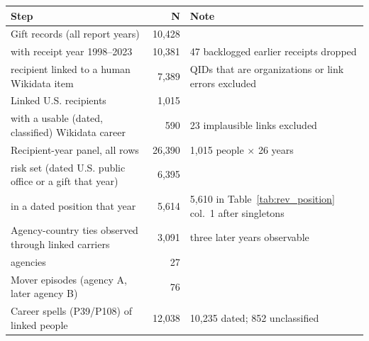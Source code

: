 \begin{tabular}{lrl}
\toprule
Step & N & Note \\
\midrule
Gift records (all report years) & 10,428 &  \\
\quad with receipt year 1998--2023 & 10,381 & 47 backlogged earlier receipts dropped \\
\quad recipient linked to a human Wikidata item & 7,389 & QIDs that are organizations or link errors excluded \\
Linked U.S. recipients & 1,015 &  \\
\quad with a usable (dated, classified) Wikidata career & 590 & 23 implausible links excluded \\
Recipient-year panel, all rows & 26,390 & 1,015 people $\times$ 26 years \\
\quad risk set (dated U.S. public office or a gift that year) & 6,395 &  \\
\quad in a dated position that year & 5,614 & 5,610 in Table~\ref{tab:rev_position} col.~1 after singletons \\
Agency-country ties observed through linked carriers & 3,091 & three later years observable \\
\quad agencies & 27 &  \\
Mover episodes (agency A, later agency B) & 76 &  \\
Career spells (P39/P108) of linked people & 12,038 & 10,235 dated; 852 unclassified \\
\bottomrule
\end{tabular}
